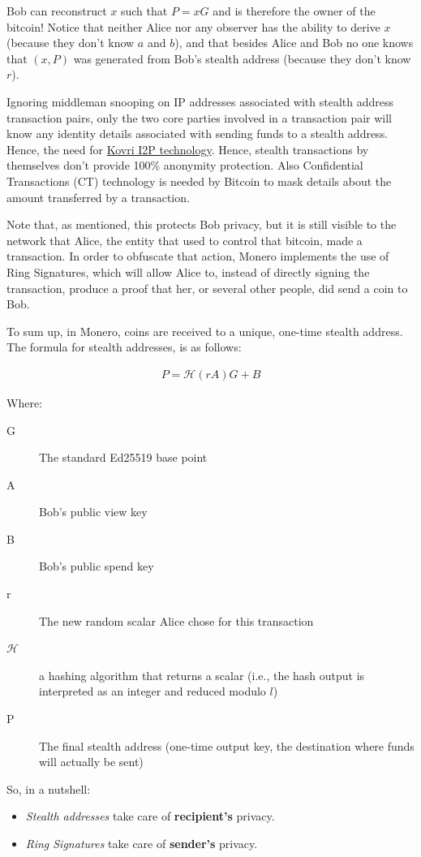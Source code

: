 Bob can reconstruct $x$ such that $P = xG$ and is therefore the owner of the bitcoin! Notice that neither Alice nor any observer has the ability to derive $x$ (because they don't know $a$ and $b$), and that besides Alice and Bob no one knows that $(x,P)$ was generated from Bob's stealth address (because they don't know $r$).

Ignoring middleman snooping on IP addresses associated with stealth address transaction pairs, only the two core parties involved in a transaction pair will know any identity details associated with sending funds to a stealth address. Hence, the need for \hyperref[sec:Kovri]{Kovri I2P technology}. Hence, stealth transactions by themselves don't provide 100\% anonymity protection. Also Confidential Transactions (CT) technology is needed by Bitcoin to mask details about the amount transferred by a transaction.

Note that, as mentioned, this protects Bob privacy, but it is still visible to the network that Alice, the entity that used to control that bitcoin, made a transaction. In order to obfuscate that action, Monero implements the use of Ring Signatures, which will allow Alice to, instead of directly signing the transaction, produce a proof that her, or several other people, did send a coin to Bob.

To sum up, in Monero, coins are received to a unique, one-time stealth address. The formula for stealth addresses, is as follows:

\begin{align*}
  P = \mathcal{H}(rA)G + B
\end{align*}

\noindent Where:
\begin{description}
  \item [G] The standard Ed25519 base point
  \item [A] Bob's public view key
  \item [B] Bob's public spend key
  \item [r] The new random scalar Alice chose for this transaction
  \item [$\mathcal{H}$] a hashing algorithm that returns a scalar (i.e., the hash output is interpreted as an integer and reduced modulo $l$)
  \item [P] The final stealth address (one-time output key, the destination where funds will actually be sent)
\end{description}
So, in a nutshell:
\begin{itemize}
  \item \emph{Stealth addresses} take care of \textbf{recipient's} privacy.
  \item \emph{Ring Signatures} take care of \textbf{sender's} privacy.
\end{itemize}

